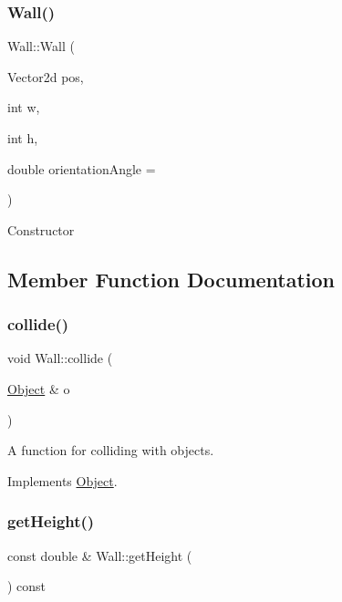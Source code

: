 \subsubsection{\texorpdfstring{Wall()}{Wall()}}
{\footnotesize\ttfamily Wall\+::\+Wall (\begin{DoxyParamCaption}\item[{Vector2d}]{pos,  }\item[{int}]{w,  }\item[{int}]{h,  }\item[{double}]{orientation\+Angle = {} }\end{DoxyParamCaption})\hspace{0.3cm}{\ttfamily [inline]}}

Constructor 

\subsection{Member Function Documentation}
\hypertarget{classWall_aae68a37386f56e928ccdbd55c4464550}{}\label{classWall_aae68a37386f56e928ccdbd55c4464550} 
\subsubsection{\texorpdfstring{collide()}{collide()}}
{\footnotesize\ttfamily void Wall\+::collide (\begin{DoxyParamCaption}\item[{\hyperlink{classObject}{Object} \&}]{o }\end{DoxyParamCaption})\hspace{0.3cm}{\ttfamily [virtual]}}

A function for colliding with objects. 

Implements \hyperlink{classObject}{Object}.

\hypertarget{classWall_a9be8bb3c3696aeaf01b3d9dfaf9462cf}{}\label{classWall_a9be8bb3c3696aeaf01b3d9dfaf9462cf} 
\subsubsection{\texorpdfstring{get\+Height()}{getHeight()}}
{\footnotesize\ttfamily const double \& Wall\+::get\+Height (\begin{DoxyParamCaption}{ }\end{DoxyParamCaption}) const}

